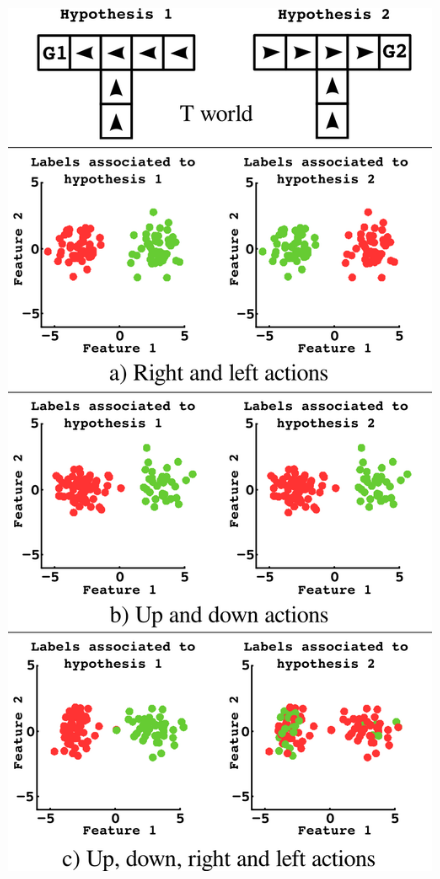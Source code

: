 
\begin{figure}[!ht]
  \centering
      \includegraphics[width=0.93\columnwidth]{img/planning.png}

\end{figure}
